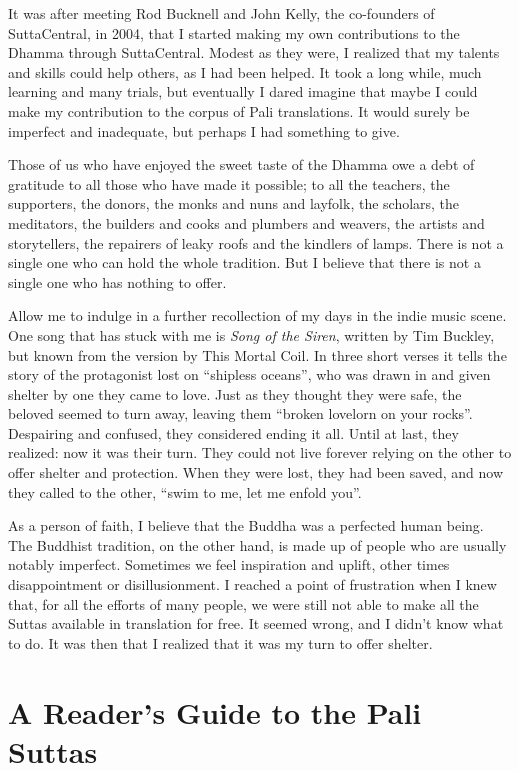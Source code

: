 \documentclass[12pt,openany]{book}%
\begin{document}
It was after meeting Rod Bucknell and John Kelly, the co-founders of SuttaCentral, in 2004, that I started making my own contributions to the Dhamma through SuttaCentral. Modest as they were, I realized that my talents and skills could help others, as I had been helped. It took a long while, much learning and many trials, but eventually I dared imagine that maybe I could make my contribution to the corpus of Pali translations. It would surely be imperfect and inadequate, but perhaps I had something to give.

Those of us who have enjoyed the sweet taste of the Dhamma owe a debt of gratitude to all those who have made it possible; to all the teachers, the supporters, the donors, the monks and nuns and layfolk, the scholars, the meditators, the builders and cooks and plumbers and weavers, the artists and storytellers, the repairers of leaky roofs and the kindlers of lamps. There is not a single one who can hold the whole tradition. But I believe that there is not a single one who has nothing to offer.

Allow me to indulge in a further recollection of my days in the indie music scene. One song that has stuck with me is \textit{Song of the Siren}, written by Tim Buckley, but known from the version by This Mortal Coil. In three short verses it tells the story of the protagonist lost on “shipless oceans”, who was drawn in and given shelter by one they came to love. Just as they thought they were safe, the beloved seemed to turn away, leaving them “broken lovelorn on your rocks”. Despairing and confused, they considered ending it all. Until at last, they realized: now it was their turn. They could not live forever relying on the other to offer shelter and protection. When they were lost, they had been saved, and now they called to the other, “swim to me, let me enfold you”.

As a person of faith, I believe that the Buddha was a perfected human being. The Buddhist tradition, on the other hand, is made up of people who are usually notably imperfect. Sometimes we feel inspiration and uplift, other times disappointment or disillusionment. I reached a point of frustration when I knew that, for all the efforts of many people, we were still not able to make all the Suttas available in translation for free. It seemed wrong, and I didn’t know what to do. It was then that I realized that it was my turn to offer shelter.

%
\chapter*{A Reader’s Guide to the Pali Suttas}
\end{document}
